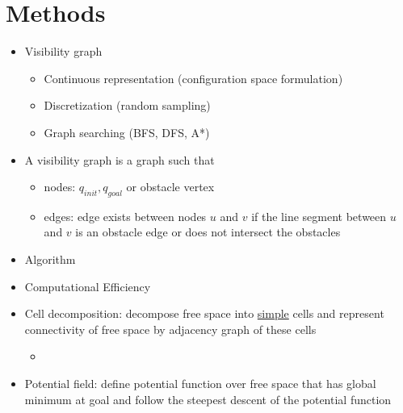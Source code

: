 \documentclass[../main.tex]{subfiles}
\begin{document}
    \section{Methods}
    \begin{itemize}
        \item Visibility graph
        \begin{itemize}
            \item Continuous representation (configuration space formulation)
            \item Discretization (random sampling)
            \item Graph searching (BFS, DFS, A*)
        \end{itemize}
        \item A visibility graph is a graph such that
        \begin{itemize}
            \item nodes: $q_{init}, q_{goal}$ or obstacle vertex
            \item edges: edge exists between nodes $u$ and $v$ if the line segment between $u$ and $v$ is an obstacle edge or does not intersect the obstacles
        \end{itemize}
        \item Algorithm
        \item Computational Efficiency
        \item Cell decomposition: decompose free space into \underline{simple} cells and represent connectivity of free space by adjacency graph of these cells
        \begin{itemize}
            \item
        \end{itemize}
        \item Potential field: define potential function over free space that has global minimum at goal and follow the steepest descent of the potential function
    \end{itemize}
\end{document}
